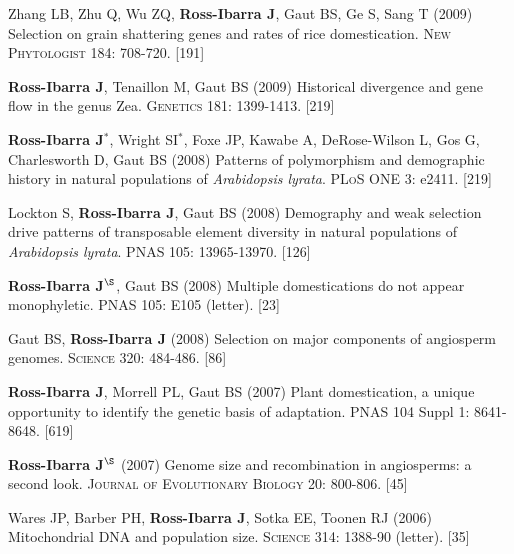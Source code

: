 \documentclass[letterpaper,10pt]{article}
\begin{document}
\begin{etaremune}
\item Zhang LB, Zhu Q, Wu ZQ, {\bf Ross-Ibarra J}, Gaut BS, Ge S, Sang T (2009) Selection on grain shattering genes and rates of rice domestication.  \textsc{New Phytologist} 184: 708-720.
{} [191]\\

\item {\bf Ross-Ibarra J}, Tenaillon M, Gaut BS (2009) Historical divergence and gene flow in the genus Zea.  \textsc{Genetics} 181: 1399-1413.
{} [219]\\


\item {\bf Ross-Ibarra J}$^*$, Wright SI$^*$, Foxe JP, Kawabe A, DeRose-Wilson L, Gos G, Charlesworth D, Gaut BS (2008) Patterns of polymorphism and demographic history in natural populations of \emph{Arabidopsis lyrata}.  \textsc{PLoS ONE} 3: e2411.
{} [219]\\


\item Lockton S, {\bf Ross-Ibarra J}, Gaut BS (2008) Demography and weak selection drive patterns of transposable element diversity in natural populations of \emph{Arabidopsis lyrata}. PNAS 105: 13965-13970.
{} [126]\\


\item {\bf Ross-Ibarra J}$^\S$, Gaut BS (2008) Multiple domestications do not appear monophyletic. PNAS 105: E105 (letter).
{} [23]\\


\item Gaut BS, {\bf Ross-Ibarra J} (2008) Selection on major components of angiosperm genomes.  \textsc{Science} 320: 484-486.
{} [86]\\


\item {\bf Ross-Ibarra J}, Morrell PL, Gaut BS (2007) Plant domestication, a unique opportunity to identify the genetic basis of adaptation. PNAS 104 Suppl 1: 8641-8648.
{} [619]\\


\item {\bf Ross-Ibarra J}$^\S$ (2007) Genome size and recombination in angiosperms: a second look.  \textsc{Journal of Evolutionary Biology} 20: 800-806.
{} [45]\\


\item Wares JP, Barber PH, {\bf Ross-Ibarra J}, Sotka EE, Toonen RJ (2006) Mitochondrial DNA and population size.  \textsc{Science} 314: 1388-90 (letter).
{} [35]\\



\end{etaremune}
\end{document}
